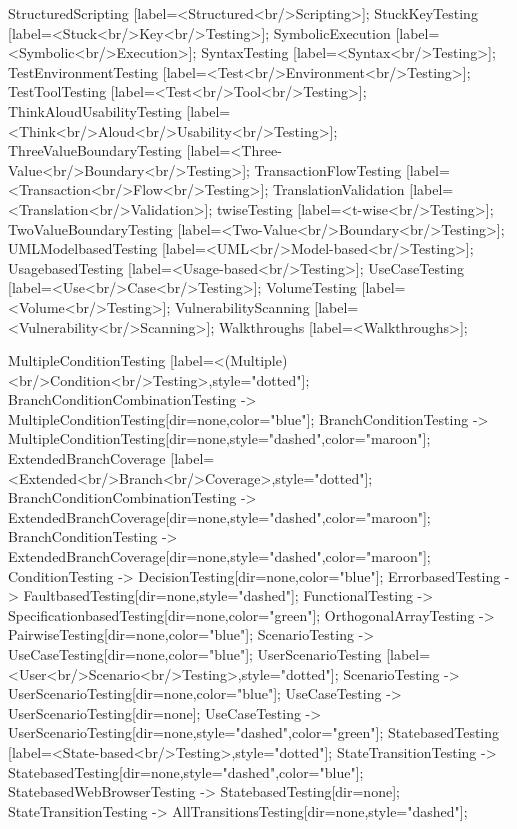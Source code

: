 \documentclass{article}
\begin{document}
{StructuredScripting [label=<Structured<br/>Scripting>];
StuckKeyTesting [label=<Stuck<br/>Key<br/>Testing>];
SymbolicExecution [label=<Symbolic<br/>Execution>];
SyntaxTesting [label=<Syntax<br/>Testing>];
TestEnvironmentTesting [label=<Test<br/>Environment<br/>Testing>];
TestToolTesting [label=<Test<br/>Tool<br/>Testing>];
ThinkAloudUsabilityTesting [label=<Think<br/>Aloud<br/>Usability<br/>Testing>];
ThreeValueBoundaryTesting [label=<Three-Value<br/>Boundary<br/>Testing>];
TransactionFlowTesting [label=<Transaction<br/>Flow<br/>Testing>];
TranslationValidation [label=<Translation<br/>Validation>];
twiseTesting [label=<t-wise<br/>Testing>];
TwoValueBoundaryTesting [label=<Two-Value<br/>Boundary<br/>Testing>];
UMLModelbasedTesting [label=<UML<br/>Model-based<br/>Testing>];
UsagebasedTesting [label=<Usage-based<br/>Testing>];
UseCaseTesting [label=<Use<br/>Case<br/>Testing>];
VolumeTesting [label=<Volume<br/>Testing>];
VulnerabilityScanning [label=<Vulnerability<br/>Scanning>];
Walkthroughs [label=<Walkthroughs>];

MultipleConditionTesting [label=<(Multiple)<br/>Condition<br/>Testing>,style="dotted"];
BranchConditionCombinationTesting -> MultipleConditionTesting[dir=none,color="blue"];
BranchConditionTesting -> MultipleConditionTesting[dir=none,style="dashed",color="maroon"];
ExtendedBranchCoverage [label=<Extended<br/>Branch<br/>Coverage>,style="dotted"];
BranchConditionCombinationTesting -> ExtendedBranchCoverage[dir=none,style="dashed",color="maroon"];
BranchConditionTesting -> ExtendedBranchCoverage[dir=none,style="dashed",color="maroon"];
ConditionTesting -> DecisionTesting[dir=none,color="blue"];
ErrorbasedTesting -> FaultbasedTesting[dir=none,style="dashed"];
FunctionalTesting -> SpecificationbasedTesting[dir=none,color="green"];
OrthogonalArrayTesting -> PairwiseTesting[dir=none,color="blue"];
ScenarioTesting -> UseCaseTesting[dir=none,color="blue"];
UserScenarioTesting [label=<User<br/>Scenario<br/>Testing>,style="dotted"];
ScenarioTesting -> UserScenarioTesting[dir=none,color="blue"];
UseCaseTesting -> UserScenarioTesting[dir=none];
UseCaseTesting -> UserScenarioTesting[dir=none,style="dashed",color="green"];
StatebasedTesting [label=<State-based<br/>Testing>,style="dotted"];
StateTransitionTesting -> StatebasedTesting[dir=none,style="dashed",color="blue"];
StatebasedWebBrowserTesting -> StatebasedTesting[dir=none];
StateTransitionTesting -> AllTransitionsTesting[dir=none,style="dashed"];

}
\end{document}
